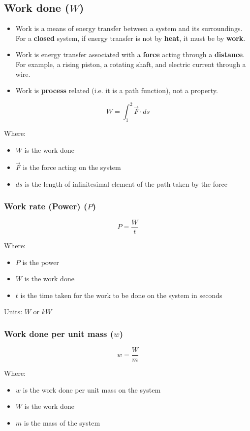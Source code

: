 \documentclass[11pt]{article}
\begin{document}
\newpage
\subsection{Work done (\(W\))}
\label{sec:orgb6408f6}
\begin{itemize}
\item Work is a means of energy transfer between a system and its surroundings. For a \textbf{closed} system, if energy transfer is not by \textbf{heat}, it must be by \textbf{work}.
\item Work is energy transfer associated with a \textbf{force} acting through a \textbf{distance}. For example, a rising piston, a rotating shaft, and electric current through a wire.
\item Work is \textbf{process} related (i.e. it is a path function), not a property.
\end{itemize}

\[W = \int_1^2 \vec{F} \cdot ds\]

Where:
\begin{itemize}
\item \(W\) is the work done
\item \(\vec{F}\) is the force acting on the system
\item \(ds\) is the length of infinitesimal element of the path taken by the force
\end{itemize}
\subsubsection{Work rate (Power) (\(P\))}
\label{sec:org51507da}
\[P = \frac{W}{t}\]

Where:
\begin{itemize}
\item \(P\) is the power
\item \(W\) is the work done
\item \(t\) is the time taken for the work to be done on the system in seconds
\end{itemize}

Units: \(\unit{W}\) or \(\unit{kW}\)

\newpage
\subsubsection{Work done per unit mass (\(w\))}
\label{sec:org72c5b7c}
\[w = \frac{W}{m}\]

Where:
\begin{itemize}
\item \(w\) is the work done per unit mass on the system
\item \(W\) is the work done
\item \(m\) is the mass of the system
\end{itemize}
\end{document}
